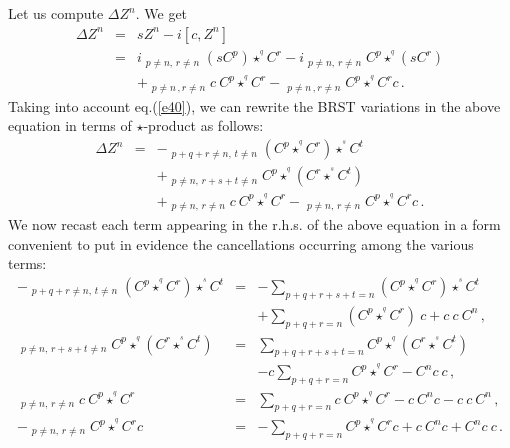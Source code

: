 \documentclass[a4paper,12pt]{article}
\newcommand{\stargr}[1]{\star^{\!\!\!^#1}}
\begin{document}
Let us compute $\Delta Z^n$. We get
%
\begin{eqnarray}
\Delta Z^n & = & sZ^n - i [c,Z^n] \nonumber \\
           & = & i \mathop{\sum_{p+q+r=n}}_{p\neq n, \, r \neq n}
                 \left(s C^p\right) \stargr{q} C^r 
               - i \mathop{\sum_{p+q+r=n}}_{p\neq n, \, r \neq n}
                 C^p \stargr{q} \left(s C^r\right) \nonumber \\
	   &   & + \mathop{\sum_{p+q+r=n}}_{p \neq n \, , r \neq n}
                 c\ C^p \stargr{q} C^r 
                 - \mathop{\sum_{p+q+r=n}}_{p \neq n \, , r \neq n}
                 C^p \stargr{q} C^r c \, .
\label{e46}
\end{eqnarray}
%
Taking into account eq.(\ref{e40}), we can rewrite
the BRST variations in the above equation in terms of $\star$-product
 as follows:
%
\begin{eqnarray}
\Delta Z^n & = &
- \mathop{\sum_{p+q+r+s+t=n}}_{p+q+r \neq n, \, t \neq n}
\left ( C^p \stargr{q} C^r \right ) \stargr{s} C^t \nonumber \\
& & + \mathop{\sum_{p+q+r+s+t=n}}_{p \neq n , \, r+s+t \neq n}
      C^p \stargr{q} \left ( C^r \stargr{s} C^t \right ) \nonumber \\
& & + \mathop{\sum_{p+q+r=n}}_{p \neq n, \, r \neq n} c\ C^p \stargr{q} C^r
    - \mathop{\sum_{p+q+r=n}}_{p \neq n, \, r \neq n} C^p \stargr{q} C^r c \, .
\label{e47}
\end{eqnarray}
%
We now recast each term appearing in the r.h.s. of the above
 equation in a form convenient to put in evidence 
 the cancellations occurring among the various terms:
%
\begin{eqnarray}
- \mathop{\sum_{p+q+r+s+t=n}}_{p+q+r \neq n, \, t \neq n}
\left ( C^p \stargr{q} C^r \right ) \stargr{s} C^t & = &
- \sum_{p+q+r+s+t=n} \left ( C^p \stargr{q} C^r \right ) \stargr{s} C^t
\nonumber \\
&& + \sum_{p+q+r=n} \left ( C^p \stargr{q} C^r \right )\ c + c\ c\ C^n \, ,
\nonumber \\
\mathop{\sum_{p+q+r+s+t=n}}_{p \neq n , \, r+s+t \neq n}
    C^p \stargr{q} \left ( C^r \stargr{s} C^t \right ) & = & 
\sum_{p+q+r+s+t=n} C^p \stargr{q} \left ( C^r \stargr{s} C^t \right )
\nonumber \\
&& - c\sum_{p+q+r=n} C^p \stargr{q} C^r - C^n c\ c \nonumber \, , \\
\mathop{\sum_{p+q+r=n}}_{p \neq n, \, r \neq n} c\ C^p \stargr{q} C^r
& = & \sum_{p+q+r=n} c\ C^p \stargr{q} C^r - c\ C^nc - c\ c\ C^n \, ,
\nonumber \\
- \mathop{\sum_{p+q+r=n}}_{p \neq n, \, r \neq n} C^p \stargr{q} C^r c
& = & - \sum_{p+q+r=n} C^p \stargr{q} C^r c + c\ C^n c + C^n c\ c \, .
\label{e48}
\end{eqnarray} 
\end{document}
